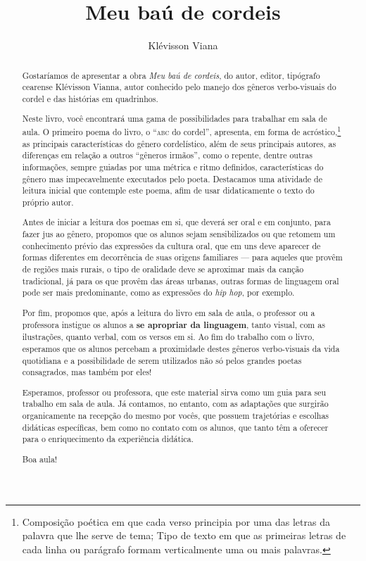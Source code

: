 \documentclass[11pt]{extarticle}
\newcommand{\AutorLivro}{Klévisson Viana}
\newcommand{\TituloLivro}{Meu baú de cordeis}
\newcommand{\colaborador}{Renier Silva}
\begin{document}
\title{\TituloLivro}
\author{\AutorLivro}
\def\authornotes{\colaborador}

\date{}
\maketitle


\tableofcontents


\begin{abstract}
Gostaríamos de apresentar a obra \textit{Meu baú de cordeis}, do autor, editor,
tipógrafo cearense Klévisson Vianna, autor conhecido pelo manejo dos gêneros verbo-visuais
do cordel e das histórias em quadrinhos.

Neste livro, você encontrará uma gama de possibilidades para trabalhar em sala de 
aula. O primeiro poema do livro, o ``\textsc{abc} do cordel'', apresenta, 
em forma de acróstico,\footnote{Composição poética em que cada verso principia por uma das letras da palavra que lhe serve de tema; Tipo de texto em que as primeiras letras de cada linha ou parágrafo formam verticalmente uma ou mais palavras.} as principais características do gênero cordelístico,
além de seus principais autores, as diferenças em relação a outros ``gêneros irmãos'',
como o repente, dentre outras informações, sempre guiadas por uma métrica e ritmo
definidos, características do gênero mas impecavelmente executados pelo poeta. 
Destacamos uma atividade de leitura inicial que contemple este poema, afim de
usar didaticamente o texto do próprio autor. 

Antes de iniciar a leitura dos poemas em si, que deverá ser oral e em conjunto,
para fazer jus ao gênero, propomos que os alunos sejam sensibilizados 
ou que retomem um conhecimento prévio das expressões da cultura oral,
que em uns deve aparecer de formas diferentes em decorrência de suas origens 
familiares --- para aqueles que provêm de regiões mais rurais,
o tipo de oralidade deve se aproximar mais da canção tradicional,
já para os que provêm das áreas urbanas, outras formas de linguagem
oral pode ser mais predominante, como as expressões do \textit{hip hop},
por exemplo. 

Por fim, propomos que, após a leitura do livro em sala de aula, 
o professor ou a professora instigue os alunos a \textbf{se apropriar da linguagem},
tanto visual, com as ilustrações, quanto verbal, com os versos em si. 
Ao fim do trabalho com o livro, esperamos que os alunos percebam a proximidade
destes gêneros verbo-visuais da vida quotidiana e a possibilidade de 
serem utilizados não só pelos grandes poetas consagrados, mas também por eles!

Esperamos, professor ou professora, que este material sirva como um guia 
para seu trabalho em sala de aula. Já contamos, no entanto, com as adaptações
que surgirão organicamente na recepção do mesmo por vocês, que possuem 
trajetórias e escolhas didáticas específicas, bem como no contato com os 
alunos, que tanto têm a oferecer para o enriquecimento da experiência didática. 

Boa aula!
\end{abstract}
\end{document}
